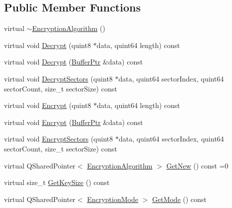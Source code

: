 \subsection*{Public Member Functions}
\begin{DoxyCompactItemize}
\item 
virtual \hyperlink{class_gost_crypt_1_1_volume_1_1_encryption_algorithm_a09b724f31b4be142ddeb7d91a737dddb}{$\sim$\+Encryption\+Algorithm} ()
\item 
virtual void \hyperlink{class_gost_crypt_1_1_volume_1_1_encryption_algorithm_a0e6ae382e87cf1be84f6c191932c0ef0}{Decrypt} (quint8 $\ast$data, quint64 length) const
\item 
virtual void \hyperlink{class_gost_crypt_1_1_volume_1_1_encryption_algorithm_ae74ed748b3b3d1413345af12fcda6009}{Decrypt} (\hyperlink{class_gost_crypt_1_1_buffer_ptr}{Buffer\+Ptr} \&data) const
\item 
virtual void \hyperlink{class_gost_crypt_1_1_volume_1_1_encryption_algorithm_ac7c31151530433ddaebaf26b0fc42ded}{Decrypt\+Sectors} (quint8 $\ast$data, quint64 sector\+Index, quint64 sector\+Count, size\+\_\+t sector\+Size) const
\item 
virtual void \hyperlink{class_gost_crypt_1_1_volume_1_1_encryption_algorithm_a82514ac98812a23089feae002179e501}{Encrypt} (quint8 $\ast$data, quint64 length) const
\item 
virtual void \hyperlink{class_gost_crypt_1_1_volume_1_1_encryption_algorithm_ac1b39918f32e90bf26f9c68e2f28883e}{Encrypt} (\hyperlink{class_gost_crypt_1_1_buffer_ptr}{Buffer\+Ptr} \&data) const
\item 
virtual void \hyperlink{class_gost_crypt_1_1_volume_1_1_encryption_algorithm_aa4a1c39982265c779a17dad7ad772a71}{Encrypt\+Sectors} (quint8 $\ast$data, quint64 sector\+Index, quint64 sector\+Count, size\+\_\+t sector\+Size) const
\item 
virtual Q\+Shared\+Pointer$<$ \hyperlink{class_gost_crypt_1_1_volume_1_1_encryption_algorithm}{Encryption\+Algorithm} $>$ \hyperlink{class_gost_crypt_1_1_volume_1_1_encryption_algorithm_ab77654d47cfabd0937eab82beaaac277}{Get\+New} () const =0
\item 
virtual size\+\_\+t \hyperlink{class_gost_crypt_1_1_volume_1_1_encryption_algorithm_ab086256fa51d87e6012c23d9f317964e}{Get\+Key\+Size} () const
\item 
virtual Q\+Shared\+Pointer$<$ \hyperlink{class_gost_crypt_1_1_volume_1_1_encryption_mode}{Encryption\+Mode} $>$ \hyperlink{class_gost_crypt_1_1_volume_1_1_encryption_algorithm_ad0812665fbdfda6920564248558a8dfb}{Get\+Mode} () const

\end{DoxyCompactItemize}
